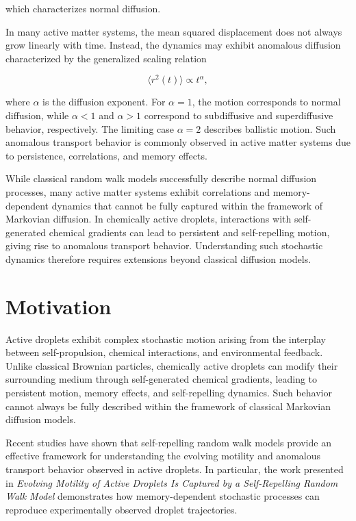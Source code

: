 which characterizes normal diffusion.

In many active matter systems, the mean squared displacement does not always grow linearly with time. Instead, the dynamics may exhibit anomalous diffusion characterized by the generalized scaling relation\cite{balakrishnan2021}

\begin{equation}
\langle r^2(t)\rangle \propto t^\alpha,
\end{equation}

where $\alpha$ is the diffusion exponent. For $\alpha = 1$, the motion corresponds to normal diffusion, while $\alpha < 1$ and $\alpha > 1$ correspond to subdiffusive and superdiffusive behavior, respectively. The limiting case $\alpha = 2$ describes ballistic motion. Such anomalous transport behavior is commonly observed in active matter systems due to persistence, correlations, and memory effects\cite{balakrishnan2021,vrugt2025}.

While classical random walk models successfully describe normal diffusion processes, many active matter systems exhibit correlations and memory-dependent dynamics that cannot be fully captured within the framework of Markovian diffusion. In chemically active droplets, interactions with self-generated chemical gradients can lead to persistent and self-repelling motion, giving rise to anomalous transport behavior. Understanding such stochastic dynamics therefore requires extensions beyond classical diffusion models.

\section{Motivation}
Active droplets exhibit complex stochastic motion arising from the interplay between self-propulsion, chemical interactions, and environmental feedback\cite{izzet2020,hokmabad2022}. Unlike classical Brownian particles, chemically active droplets can modify their surrounding medium through self-generated chemical gradients, leading to persistent motion, memory effects, and self-repelling dynamics\cite{hokmabad2022,droplet2025}. Such behavior cannot always be fully described within the framework of classical Markovian diffusion models.

Recent studies have shown that self-repelling random walk models\cite{droplet2025} provide an effective framework for understanding the evolving motility and anomalous transport behavior observed in active droplets. In particular, the work presented in \textit{Evolving Motility of Active Droplets Is Captured by a Self-Repelling Random Walk Model}\cite{droplet2025} demonstrates how memory-dependent stochastic processes can reproduce experimentally observed droplet trajectories.

